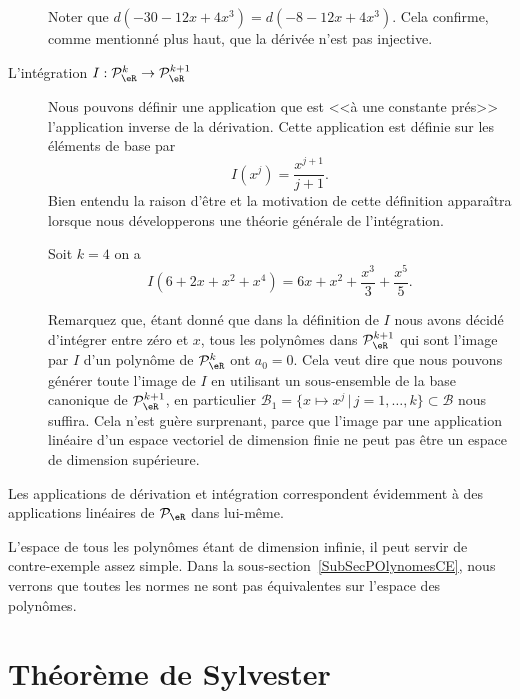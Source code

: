 \begin{description}
\begin{example}
    Noter que $d(-30-12x+4x^3)=d(-8-12x+4x^3)$. Cela confirme, comme mentionné plus haut, que la dérivée n'est pas injective.
\end{example}
      \item[L'intégration $I: \mathcal{P}_\eR^k \to \mathcal{P}_\eR^{k+1}$] Nous pouvons définir une application que est <<à une constante prés>> l'application inverse de la dérivation. Cette application est définie sur les éléments de base par
          \begin{equation}
                I(x^j)= \frac{x^{j+1}}{j+1}.
          \end{equation}
          Bien entendu la raison d'être et la motivation de cette définition apparaîtra lorsque nous développerons une théorie générale de l'intégration.

\begin{example}
   Soit $k=4$ on a
  \begin{equation}
    I(6+2x+x^2+x^4)= 6x+x^2+\frac{x^3}{3}+\frac{x^5}{5}.
    \end{equation}
\end{example}

Remarquez que, étant donné que dans la définition de $I$ nous avons décidé d'intégrer entre zéro et $x$, tous les polynômes dans $\mathcal{P}_\eR^{k+1}$ qui sont l'image par $I$ d'un polynôme de $\mathcal{P}_\eR^{k}$ ont $a_0=0$. Cela veut dire que nous pouvons générer toute l'image de $I$ en utilisant un sous-ensemble de la base canonique de $\mathcal{P}_\eR^{k+1}$,  en particulier $\mathcal{B}_1=\{x\mapsto x^j \,|\, j=1, \ldots, k\}\subset \mathcal{B}$ nous suffira. Cela n'est guère surprenant, parce que l'image par une application linéaire d'un espace vectoriel de dimension finie ne peut pas être un espace de dimension supérieure.
\end{description}

Les applications de dérivation et intégration correspondent évidemment à des applications linéaires de $\mathcal{P}_\eR$ dans lui-même.

L'espace de tous les polynômes étant de dimension infinie, il peut servir de contre-exemple assez simple. Dans la sous-section~\ref{SubSecPOlynomesCE}, nous verrons que toutes les normes ne sont pas équivalentes sur l'espace des polynômes.

\section{Théorème de Sylvester}

